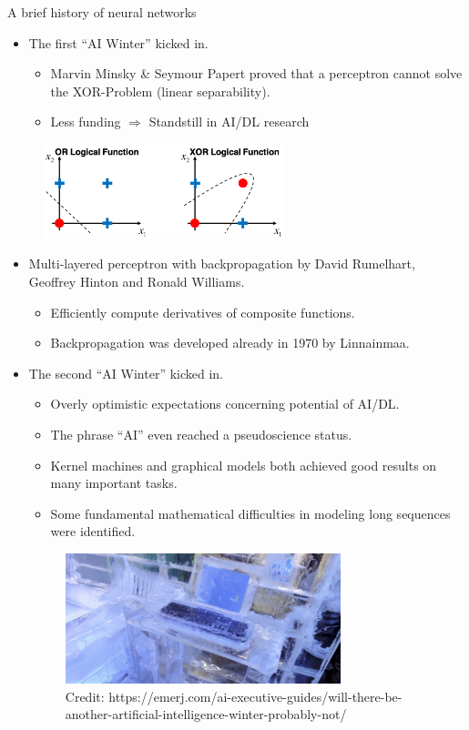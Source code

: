 \begin{vbframe}{A brief history of neural networks}
\begin{itemize}
\item {} The first \enquote{AI Winter} kicked in.
\begin{itemize}
\item Marvin Minsky \& Seymour Papert proved that a perceptron cannot solve the XOR-Problem (linear separability).
\item Less funding $\Rightarrow$ Standstill in AI/DL research
\end{itemize}
\end{itemize}
\begin{figure}
\includegraphics[width=7cm]{figure/orvsxor.png}
\end{figure}
\begin{itemize}
\item {} Multi-layered perceptron with backpropagation by David Rumelhart, Geoffrey Hinton and Ronald Williams.
\begin{itemize}
\item Efficiently compute derivatives of composite functions.
\item Backpropagation was developed already in 1970 by Linnainmaa.
\end{itemize}
\framebreak

\item {} The second \enquote{AI Winter} kicked in.

\begin{itemize}
\footnotesize\item Overly optimistic expectations concerning potential of AI/DL.
\footnotesize\item The phrase \enquote{AI} even reached a pseudoscience status.
\footnotesize\item Kernel machines and graphical models both achieved good results on many important tasks.
\footnotesize\item Some fundamental mathematical difficulties in modeling long sequences were identified.
\end{itemize}
\begin{figure}
\includegraphics[width=8cm]{figure/ai_winter.jpg}
\\
\tiny{Credit: https://emerj.com/ai-executive-guides/will-there-be-another-artificial-intelligence-winter-probably-not/}
\end{figure}
\framebreak


\end{itemize}
\end{vbframe}
